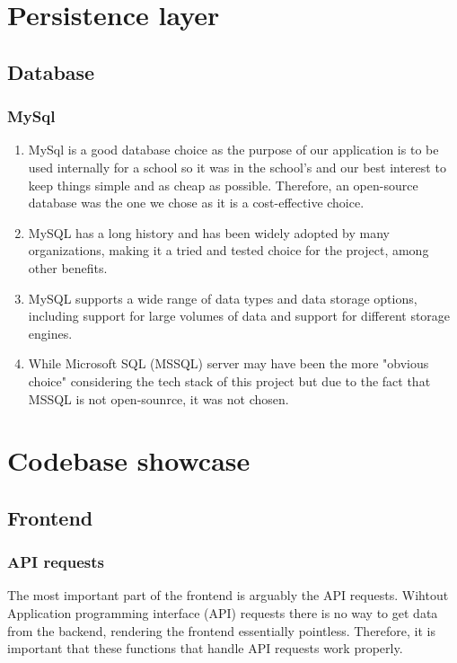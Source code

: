 \documentclass[singlespacing,12pt,parskip,headsepline,consistentlayout]{article}
\begin{document}
\section{Persistence layer}
\subsection{Database}

\subsubsection{MySql}
\begin{enumerate}
    \item MySql is a good database choice as the purpose of our application is to be used internally for a school so it was in the school’s and our best interest to keep things simple and as cheap as possible. Therefore, an open-source database \cite{mysqlDocs} was the one we chose as it is a cost-effective choice.
    \item MySQL has a long history and has been widely adopted by many organizations, making it a tried and tested choice for the project, among other benefits.
    \item MySQL supports a wide range of data types and data storage options, including support for large volumes of data and support for different storage engines.
    \item While Microsoft SQL (MSSQL) server  may have been the more "obvious choice" considering the tech stack of this project but due to the fact that MSSQL is not open-sounrce, it was not chosen. 
\end{enumerate}

\section{Codebase showcase}

\subsection{Frontend}

\subsubsection{API requests}

The most important part of the frontend is arguably the API requests. Wihtout Application programming interface (API) requests there is no way to get data from the backend, rendering the frontend essentially pointless. Therefore, it is important that these functions that handle API requests work properly. 
\end{document}

